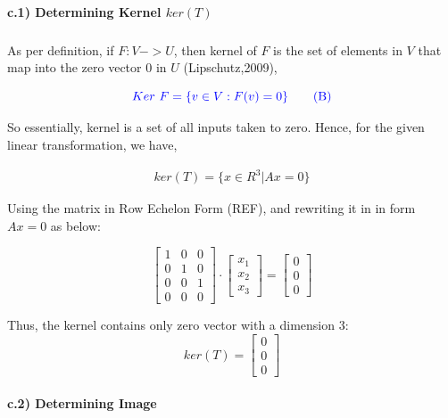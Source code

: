 \documentclass[a4paper]{report}
\begin{document}
\paragraph{c.1) Determining Kernel $ker(T)$}

\subparagraph{}

As per definition, if $F:V->U$, then kernel of $F$ is the set of elements in $V$ that map into the zero vector $0$ in $U$ (Lipschutz,2009),

\begin{equation}
    \color{blue} Ker\ F=\{v\in V: F(v)=0\} \tag{B}
\end{equation}

So essentially, kernel is a set of all inputs taken to zero. Hence, for the given linear transformation, we have,

\begin{align*}
    ker(T)= \{x\in R^3 | Ax=0\}
\end{align*}

Using the matrix in Row Echelon Form (REF), and rewriting it in in form $Ax=0$  as below:

\[ \begin{bmatrix}
    1&0&0 \\
    0&1&0\\
    0&0&1 \\
    0&0&0
\end{bmatrix} \cdot \begin{bmatrix}
    x_1 \\
    x_2 \\
    x_3
\end{bmatrix} = \begin{bmatrix}
    0 \\
    0 \\
    0
\end{bmatrix}\]

\vspace{5mm}
Thus, the kernel contains only zero vector with a dimension 3: \[ \boxed{ ker(T)=\begin{bmatrix}
    0 \\
    0 \\
    0
\end{bmatrix}} \]

\paragraph{c.2) Determining Image} 

\subparagraph{}
\end{document}
